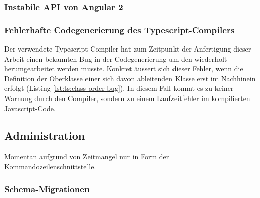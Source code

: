 \subsubsection{Instabile API von Angular 2}

\subsubsection{Fehlerhafte Codegenerierung des Typescript-Compilers}

Der verwendete Typescript-Compiler hat zum Zeitpunkt der Anfertigung dieser Arbeit einen bekannten Bug in der Codegenerierung \cite{ts-compiler-class-order-bug} um den wiederholt herumgearbeitet werden musste. Konkret äussert sich dieser Fehler, wenn die Definition der Oberklasse einer sich davon ableitenden Klasse erst im Nachhinein erfolgt (Listing \ref{lst:ts:class-order-bug}). In diesem Fall kommt es zu keiner Warnung durch den Compiler, sondern zu einem Laufzeitfehler im kompilierten Javascript-Code.



\subsection{Administration}
\label{sec:implementation-administration}

Momentan aufgrund von Zeitmangel nur in Form der Kommandozeilenschnittstelle.

\subsubsection{Schema-Migrationen}
\label{sec:implementation-migration}

